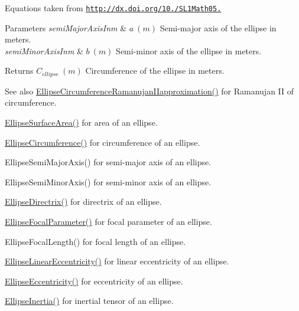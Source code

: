 Equations taken from \href{http://dx.doi.org/10.3247/SL1Math05.004}{\tt http\+://dx.\+doi.\+org/10./\+S\+L1\+Math05.} 
\begin{DoxyParams}{Parameters}
{\em semi\+Major\+Axis\+Inm} & $ a\ (m)$ Semi-\/major axis of the ellipse in meters. \\
\hline
{\em semi\+Minor\+Axis\+Inm} & $ b\ (m)$ Semi-\/minor axis of the ellipse in meters. \\
\hline
\end{DoxyParams}
\begin{DoxyReturn}{Returns}
$ C_{ellipse}\ (m)$ Circumference of the ellipse in meters. 
\end{DoxyReturn}
\begin{DoxySeeAlso}{See also}
\mbox{\hyperlink{group___e_g_x_math-_geometry-2_d-_ellipse-_circumference_gaa908406db81fadc7c2d73e4e113d24d7}{Ellipse\+Circumference\+Ramanujan\+I\+Iapproximation()}} for Ramanujan II of circumference. 

\mbox{\hyperlink{group___e_g_x_math-_geometry-2_d-_ellipse-_surface_area_ga4ce8c8323e9718ce5458f4ab7f6d823d}{Ellipse\+Surface\+Area()}} for area of an ellipse. 

\mbox{\hyperlink{group___e_g_x_math-_geometry-2_d-_ellipse-_circumference_ga4172802ac674eb53467b44928ac635c7}{Ellipse\+Circumference()}} for circumference of an ellipse. 

Ellipse\+Semi\+Major\+Axis() for semi-\/major axis of an ellipse. 

Ellipse\+Semi\+Minor\+Axis() for semi-\/minor axis of an ellipse. 

\mbox{\hyperlink{group___e_g_x_math-_geometry-2_d-_ellipse-_directrix_gace8f72a8efbc9c18d3eb689151405106}{Ellipse\+Directrix()}} for directrix of an ellipse. 

\mbox{\hyperlink{group___e_g_x_math-_geometry-2_d-_ellipse-_focal_parameter_ga4cd01a38c72c092ef9791351948bf69b}{Ellipse\+Focal\+Parameter()}} for focal parameter of an ellipse. 

Ellipse\+Focal\+Length() for focal length of an ellipse. 

\mbox{\hyperlink{group___e_g_x_math-_geometry-2_d-_ellipse-_linear_eccentricity_gac70b3010e30aa8b73deb50fe2b9b9a91}{Ellipse\+Linear\+Eccentricity()}} for linear eccentricity of an ellipse. 

\mbox{\hyperlink{group___e_g_x_math-_geometry-2_d-_ellipse-_eccentricity_ga6a0a7fba17f782616894cfc447628c33}{Ellipse\+Eccentricity()}} for eccentricity of an ellipse. 

\mbox{\hyperlink{group___e_g_x_math-_geometry-2_d-_ellipse-_inertia_ga10a3049c2f04b50f271fb01dc62e4cf8}{Ellipse\+Inertia()}} for inertial tensor of an ellipse. 
\end{DoxySeeAlso}
\mbox{\label{group___e_g_x_math-_geometry-2_d-_ellipse-_circumference_gaa908406db81fadc7c2d73e4e113d24d7}} 
